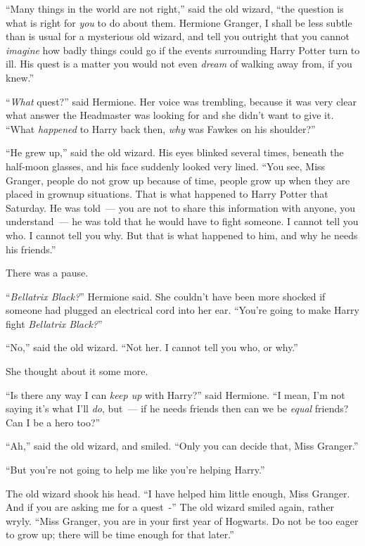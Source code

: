 ``Many things in the world are not right,'' said the old wizard, ``the question is what is right for \emph{you} to do about them. Hermione Granger, I shall be less subtle than is usual for a mysterious old wizard, and tell you outright that you cannot \emph{imagine} how badly things could go if the events surrounding Harry Potter turn to ill. His quest is a matter you would not even \emph{dream} of walking away from, if you knew.''

``\emph{What} quest?'' said Hermione. Her voice was trembling, because it was very clear what answer the Headmaster was looking for and she didn't want to give it. ``What \emph{happened} to Harry back then, \emph{why} was Fawkes on his shoulder?''

``He grew up,'' said the old wizard. His eyes blinked several times, beneath the half-moon glasses, and his face suddenly looked very lined. ``You see, Miss Granger, people do not grow up because of time, people grow up when they are placed in grownup situations. That is what happened to Harry Potter that Saturday. He was told~--- you are not to share this information with anyone, you understand~--- he was told that he would have to fight someone. I cannot tell you who. I cannot tell you why. But that is what happened to him, and why he needs his friends.''

There was a pause.

``\emph{Bellatrix Black?}'' Hermione said. She couldn't have been more shocked if someone had plugged an electrical cord into her ear. ``You're going to make Harry fight \emph{Bellatrix Black?}''

``No,'' said the old wizard. ``Not her. I cannot tell you who, or why.''

She thought about it some more.

``Is there any way I can \emph{keep up} with Harry?'' said Hermione. ``I mean, I'm not saying it's what I'll \emph{do}, but~--- if he needs friends then can we be \emph{equal} friends? Can I be a hero too?''

``Ah,'' said the old wizard, and smiled. ``Only you can decide that, Miss Granger.''

``But you're not going to help me like you're helping Harry.''

The old wizard shook his head. ``I have helped him little enough, Miss Granger. And if you are asking me for a quest~-'' The old wizard smiled again, rather wryly. ``Miss Granger, you are in your first year of Hogwarts. Do not be too eager to grow up; there will be time enough for that later.''

